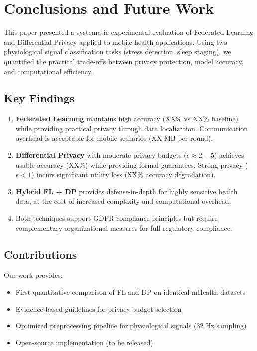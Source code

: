 \documentclass[conference]{IEEEtran}
\begin{document}
\section{Conclusions and Future Work}
\label{sec:conclusions}

This paper presented a systematic experimental evaluation of Federated Learning and Differential Privacy applied to mobile health applications. Using two physiological signal classification tasks (stress detection, sleep staging), we quantified the practical trade-offs between privacy protection, model accuracy, and computational efficiency.

\subsection{Key Findings}

\begin{enumerate}
    \item \textbf{Federated Learning} maintains high accuracy (XX\% vs XX\% baseline) while providing practical privacy through data localization. Communication overhead is acceptable for mobile scenarios (XX MB per round).
    
    \item \textbf{Differential Privacy} with moderate privacy budgets ($\epsilon \approx 2-5$) achieves usable accuracy (XX\%) while providing formal guarantees. Strong privacy ($\epsilon < 1$) incurs significant utility loss (XX\% accuracy degradation).
    
    \item \textbf{Hybrid FL + DP} provides defense-in-depth for highly sensitive health data, at the cost of increased complexity and computational overhead.
    
    \item Both techniques support GDPR compliance principles but require complementary organizational measures for full regulatory compliance.
\end{enumerate}

\subsection{Contributions}

Our work provides:
\begin{itemize}
    \item First quantitative comparison of FL and DP on identical mHealth datasets
    \item Evidence-based guidelines for privacy budget selection
    \item Optimized preprocessing pipeline for physiological signals (32 Hz sampling)
    \item Open-source implementation (to be released)
\end{itemize}
\end{document}
